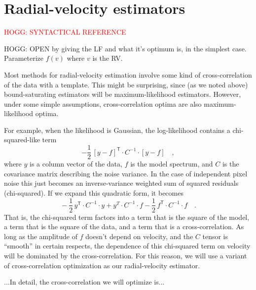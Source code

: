 \documentclass[modern]{aastex62}
\newcommand{\T}{^{\mathsf{T}}}
\newcommand{\todo}[1]{\textcolor{red}{#1}}  %
\newcommand{\acronym}[1]{{\small{#1}}}
\newcommand{\RV}{\acronym{RV}}
\begin{document}
\section{Radial-velocity estimators}
\label{s:methods}

\todo{HOGG: SYNTACTICAL REFERENCE}

HOGG: OPEN by giving the LF and what it's optimum is, in the simplest case.
Parameterize $f(v)$ where $v$ is the \RV.

Most methods for radial-velocity estimation involve some kind of
cross-correlation of the data with a template.
This might be surprising, since (as we noted above) bound-saturating
estimators will be maximum-likelihood estimators.
However, under some simple assumptions, cross-correlation optima are
also maximum-likelihood optima.

For example, when the likelihood is Gaussian, the log-likelihood
contains a chi-squared-like term
\begin{equation}
-\frac{1}{2}\,[y - f]\T\cdot C^{-1}\cdot [y - f] \quad ,
\end{equation}
where $y$ is a column vector of the data, $f$ is the model spectrum,
and $C$ is the covariance matrix describing the noise variance.
In the case of independent pixel noise this just becomes an
inverse-variance weighted sum of squared residuals (chi-squared).
If we expand this quadratic form, it becomes
\begin{equation}
{}-\frac{1}{2}\,y\T\cdot C^{-1}\cdot y + y^T\cdot C^{-1}\cdot f 
-\frac{1}{2}\,f\T\cdot C^{-1}\cdot f \quad.
\end{equation}
That is, the chi-squared term factors into a term that is the square
of the model, a term that is the square of the data, and a term that
is a cross-correlation.
As long as the amplitude of $f$ doesn't depend on velocity, and the
$C$ tensor is ``smooth'' in certain respects, the dependence of this
chi-squared term on velocity will be dominated by the
cross-correlation.
For this reason, we will use a variant of cross-correlation
optimization as our radial-velocity estimator.

...In detail, the cross-correlation we will optimize is...
\end{document}
